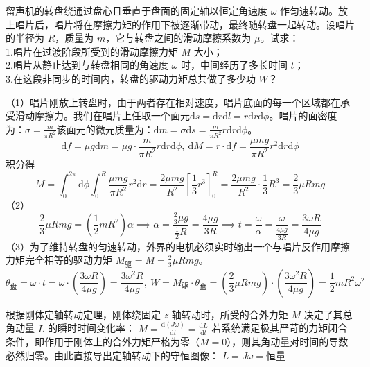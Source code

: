 \documentclass[lang=cn,11pt]{elegantbook}
\begin{document}
\begin{exercise}
留声机的转盘绕通过盘心且垂直于盘面的固定轴以恒定角速度 $\omega$ 作匀速转动。放上唱片后，唱片将在摩擦力矩的作用下被逐渐带动，最终随转盘一起转动。设唱片的半径为 $R$，质量为 $m$，它与转盘之间的滑动摩擦系数为 $\mu$。试求：\\
1.唱片在过渡阶段所受到的滑动摩擦力矩 $M$ 大小；\\
2.唱片从静止达到与转盘相同的角速度 $\omega$ 时，中间经历了多长时间 $t$；\\
3.在这段非同步的时间内，转盘的驱动力矩总共做了多少功 $W$？
\end{exercise}
\begin{solution}
（1）唱片刚放上转盘时，由于两者存在相对速度，唱片底面的每一个区域都在承受滑动摩擦力。我们在唱片上任取一个面元$\mathrm{d}s = \mathrm{d}r\mathrm{d}l= r\mathrm{d}r\mathrm{d}\phi$。唱片的面密度为：$\sigma = \frac{m}{\pi R^2}$该面元的微元质量为：$\mathrm{d}m = \sigma \mathrm{d}s = \frac{m}{\pi R^2} r\mathrm{d}r\mathrm{d}\phi$。
$$\mathrm{d}f = \mu g\mathrm{d}m = \mu g \cdot \frac{m}{\pi R^2} r\mathrm{d}r\mathrm{d}\phi,~\mathrm{d}M = r \cdot \mathrm{d}f = \frac{\mu m g}{\pi R^2} r^2 \mathrm{d}r\mathrm{d}\phi$$积分得
\[M =\int_0^{2\pi}\mathrm{d}\phi\int_0^R \frac{\mu m g}{\pi R^2} r^2\mathrm{d}r=\frac{2\mu m g}{R^2} \left[ \frac{1}{3}r^3 \right]_0^R = \frac{2\mu m g}{R^2} \cdot \frac{1}{3}R^3 = \frac{2}{3}\mu R m g\]
（2）$$\frac{2}{3}\mu R m g = \left( \frac{1}{2}mR^2 \right) \alpha\implies \alpha = \frac{\frac{2}{3}\mu g}{\frac{1}{2}R} = \frac{4\mu g}{3R}\implies t = \frac{\omega}{\alpha} = \frac{\omega}{\frac{4\mu g}{3R}} = \frac{3\omega R}{4\mu g}$$
（3）为了维持转盘的匀速转动，外界的电机必须实时输出一个与唱片反作用摩擦力矩完全相等的驱动力矩 $M_{\text{驱}} = M = \frac{2}{3}\mu R m g$。
$$\theta_{\text{盘}} = \omega \cdot t = \omega \cdot \left( \frac{3\omega R}{4\mu g} \right) = \frac{3\omega^2 R}{4\mu g},~W = M_{\text{驱}} \cdot \theta_{\text{盘}} = \left( \frac{2}{3}\mu R m g \right) \cdot \left( \frac{3\omega^2 R}{4\mu g} \right)=\frac{1}{2}mR^2\omega^2$$
\end{solution}

\begin{theorem}[刚体定轴转动的角动量守恒定律]
根据刚体定轴转动定理，刚体绕固定 $z$ 轴转动时，所受的合外力矩 $M$ 决定了其总角动量 $L$ 的瞬时时间变化率： \(M = \frac{\mathrm{d}(J\omega)}{\mathrm{d}t} = \frac{\mathrm{d}L}{\mathrm{d}t}\) 若系统满足极其严苛的力矩闭合条件，即作用于刚体上的合外力矩严格为零（$M = 0$），则其角动量对时间的导数必然归零。由此直接导出定轴转动下的守恒图像： \(L = J\omega = \text{恒量}\) 
\end{theorem}
\end{document}
